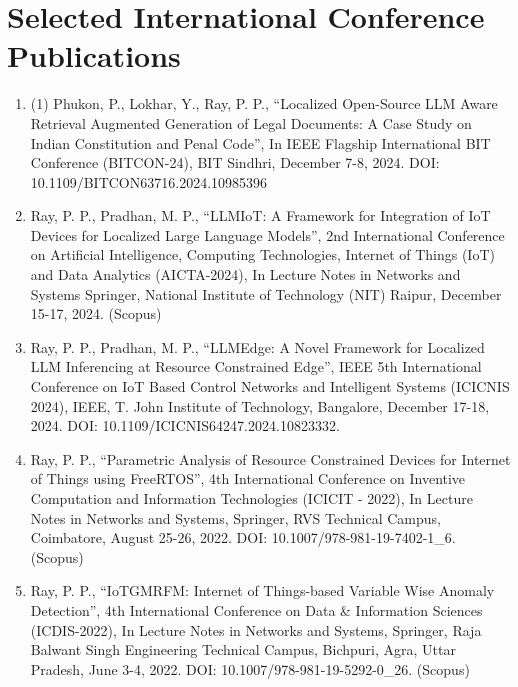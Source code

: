 \documentclass[11pt,a4paper]{moderncv}
\begin{document}
\section{\textbf{Selected International Conference Publications}}

\begin{adjustwidth}{6em}{0pt}
	\begin{enumerate}
	
	\item (1)	Phukon, P., Lokhar, Y., Ray, P. P., “Localized Open-Source LLM Aware Retrieval Augmented Generation of Legal Documents: A Case Study on Indian Constitution and Penal Code”, In IEEE Flagship International BIT Conference (BITCON-24), BIT Sindhri, December 7-8, 2024. DOI: 10.1109/BITCON63716.2024.10985396 
	
	\item Ray, P. P., Pradhan, M. P., “LLMIoT: A Framework for Integration of IoT Devices for Localized Large Language Models”, 2nd International Conference on Artificial Intelligence, Computing Technologies, Internet of Things (IoT) and Data Analytics (AICTA-2024), In Lecture Notes in Networks and Systems Springer, National Institute of Technology (NIT) Raipur, December 15-17, 2024. (Scopus)
	
	\item Ray, P. P., Pradhan, M. P., “LLMEdge: A Novel Framework for Localized LLM Inferencing at Resource Constrained Edge”, IEEE 5th International Conference on IoT Based Control Networks and Intelligent Systems (ICICNIS 2024), IEEE, T. John Institute of Technology, Bangalore, December 17-18, 2024. DOI: 10.1109/ICICNIS64247.2024.10823332.
	
	\item Ray, P. P., “Parametric Analysis of Resource Constrained Devices for Internet of Things using FreeRTOS”, 4th International Conference on Inventive Computation and Information Technologies (ICICIT - 2022), In Lecture Notes in Networks and Systems, Springer, RVS Technical Campus, Coimbatore, August 25-26, 2022. DOI: 10.1007/978-981-19-7402-1\_6. (Scopus)
	
	\item Ray, P. P., “IoTGMRFM: Internet of Things-based Variable Wise Anomaly Detection”, 4th International Conference on Data \& Information Sciences (ICDIS-2022), In Lecture Notes in Networks and Systems, Springer, Raja Balwant Singh Engineering Technical Campus, Bichpuri, Agra, Uttar Pradesh, June 3-4, 2022. DOI: 10.1007/978-981-19-5292-0\_26. (Scopus)
	

\end{enumerate}
\end{adjustwidth}
\end{document}
